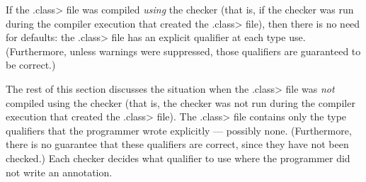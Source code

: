 If the \<.class> file was compiled \emph{using} the checker (that is,
if the checker was run during the compiler execution that created
the \<.class> file),
then there is no need for
defaults:  the \<.class> file has an explicit qualifier at each type use.
(Furthermore, unless warnings were suppressed, those qualifiers are
guaranteed to be correct.)

The rest of this section discusses the situation when the \<.class> file
was \emph{not} compiled using the checker (that is, the checker was not run
during the compiler execution that created the \<.class> file).
The \<.class> file contains only the type qualifiers
that the programmer wrote explicitly --- possibly none.
(Furthermore, there is no guarantee
that these qualifiers are correct, since they have not been checked.)
Each checker decides what qualifier to use
where the programmer did not write an annotation.


